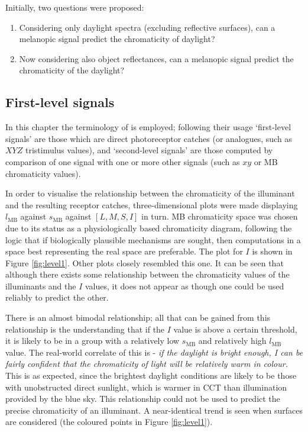 \bigskip
\noindent
Initially, two questions were proposed:
\begin{enumerate}
\item Considering only daylight spectra (excluding reflective surfaces), can a melanopic signal predict the chromaticity of daylight? \item Now considering also object reflectances, can a melanopic signal predict the chromaticity of the daylight? 
\end{enumerate}

\subsection{First-level signals}

In this chapter the terminology of \citet{barrionuevo_contributions_2014} is employed; following their usage `first-level signals' are those which are direct photoreceptor catches (or analogues, such as $XYZ$ tristimulus values), and `second-level signals' are those computed by comparison of one signal with one or more other signals (such as $xy$ or \gls{MB} chromaticity values).

In order to visualise the relationship between the chromaticity of the illuminant and the resulting receptor catches, three-dimensional plots were made displaying $l_{\text{MB}}$ against $s_{\text{MB}}$ against $[L,M,S,I]$ in turn. \gls{MB} chromaticity space was chosen due to its status as a physiologically based chromaticity diagram, following the logic that if biologically plausible mechanisms are sought, then computations in a space best representing the real space are preferable. The plot for $I$ is shown in Figure \ref{fig:level1}. Other plots closely resembled this one. It can be seen that although there exists some relationship between the chromaticity values of the illuminants and the $I$ values, it does not appear as though one could be used reliably to predict the other. 

There is an almost bimodal relationship; all that can be gained from this relationship is the understanding that if the $I$ value is above a certain threshold, it is likely to be in a group with a relatively low $s_{\text{MB}}$ and relatively high $l_{\text{MB}}$ value. The real-world correlate of this is - \textit{if the daylight is bright enough, I can be fairly confident that the chromaticity of light will be relatively warm in colour.} This is as expected, since the brightest daylight conditions are likely to be those with unobstructed direct sunlight, which is warmer in \gls{CCT} than illumination provided by the blue sky. This relationship could not be used to predict the precise chromaticity of an illuminant. A near-identical trend is seen when surfaces are considered (the coloured points in Figure \ref{fig:level1}).

